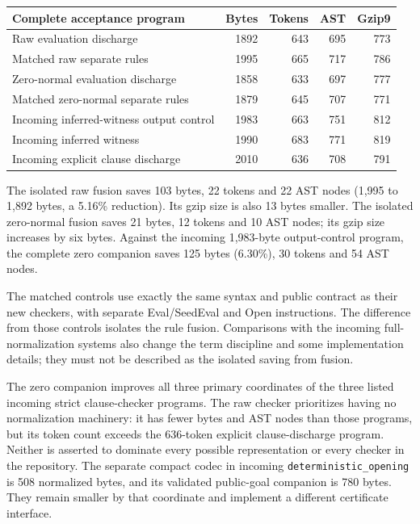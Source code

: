 \documentclass[11pt,letterpaper]{article}
\theoremstyle{definition}\newtheorem{definition}[theorem]{Definition}
\theoremstyle{remark}\newtheorem{remark}[theorem]{Remark}
\begin{document}
\begin{center}\small
\begin{tabularx}{\textwidth}{@{}Xrrrr@{}}
\toprule
Complete acceptance program & Bytes & Tokens & AST & Gzip9\\
\midrule
Raw evaluation discharge & 1892 & 643 & 695 & 773\\
Matched raw separate rules & 1995 & 665 & 717 & 786\\
Zero-normal evaluation discharge & 1858 & 633 & 697 & 777\\
Matched zero-normal separate rules & 1879 & 645 & 707 & 771\\
Incoming inferred-witness output control & 1983 & 663 & 751 & 812\\
Incoming inferred witness & 1990 & 683 & 771 & 819\\
Incoming explicit clause discharge & 2010 & 636 & 708 & 791\\
\bottomrule
\end{tabularx}
\end{center}

The isolated raw fusion saves 103 bytes, 22 tokens and 22 AST nodes
(1,995 to 1,892 bytes, a 5.16\% reduction). Its gzip size is also 13 bytes
smaller. The isolated zero-normal fusion saves 21 bytes, 12 tokens and
10 AST nodes; its gzip size increases by six bytes. Against the incoming
1,983-byte output-control program, the complete zero companion saves
125 bytes (6.30\%), 30 tokens and 54 AST nodes.


The matched controls use exactly the same syntax and public contract as
their new checkers, with separate Eval/SeedEval and Open instructions.
The difference from those controls isolates the rule fusion. Comparisons
with the incoming full-normalization systems also change the term
discipline and some implementation details; they must not be described as
the isolated saving from fusion.

The zero companion improves all three primary coordinates of the three
listed incoming strict clause-checker programs. The raw checker prioritizes
having no normalization machinery: it has fewer bytes and AST nodes than
those programs, but its token count exceeds the 636-token explicit
clause-discharge program. Neither is asserted to dominate every possible
representation or every checker in the repository. The separate compact
codec in incoming \texttt{deterministic\_opening} is 508 normalized bytes,
and its validated public-goal companion is 780 bytes. They remain smaller
by that coordinate and implement a different certificate interface.
\end{document}
